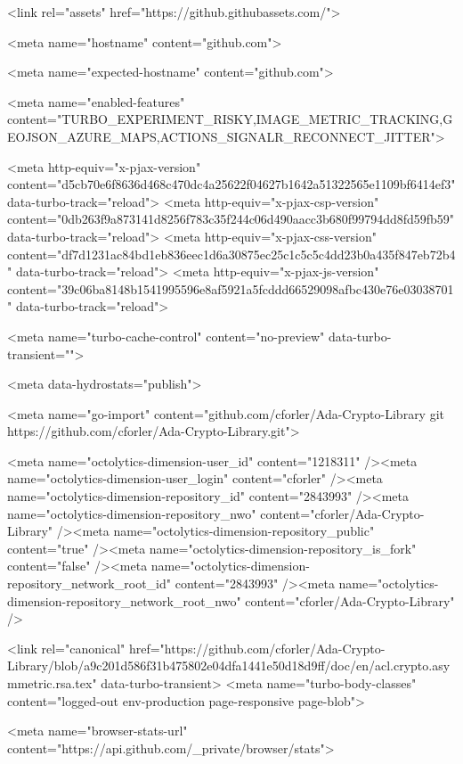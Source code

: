     <link rel="assets" href="https://github.githubassets.com/">


        <meta name="hostname" content="github.com">



        <meta name="expected-hostname" content="github.com">

    <meta name="enabled-features" content="TURBO_EXPERIMENT_RISKY,IMAGE_METRIC_TRACKING,GEOJSON_AZURE_MAPS,ACTIONS_SIGNALR_RECONNECT_JITTER">


  <meta http-equiv="x-pjax-version" content="d5cb70e6f8636d468c470dc4a25622f04627b1642a51322565e1109bf6414ef3" data-turbo-track="reload">
  <meta http-equiv="x-pjax-csp-version" content="0db263f9a873141d8256f783c35f244c06d490aacc3b680f99794dd8fd59fb59" data-turbo-track="reload">
  <meta http-equiv="x-pjax-css-version" content="df7d1231ac84bd1eb836eec1d6a30875ec25c1c5c5c4dd23b0a435f847eb72b4" data-turbo-track="reload">
  <meta http-equiv="x-pjax-js-version" content="39c06ba8148b1541995596e8af5921a5fcddd66529098afbc430e76e03038701" data-turbo-track="reload">

  <meta name="turbo-cache-control" content="no-preview" data-turbo-transient="">

        <meta data-hydrostats="publish">

  <meta name="go-import" content="github.com/cforler/Ada-Crypto-Library git https://github.com/cforler/Ada-Crypto-Library.git">

  <meta name="octolytics-dimension-user_id" content="1218311" /><meta name="octolytics-dimension-user_login" content="cforler" /><meta name="octolytics-dimension-repository_id" content="2843993" /><meta name="octolytics-dimension-repository_nwo" content="cforler/Ada-Crypto-Library" /><meta name="octolytics-dimension-repository_public" content="true" /><meta name="octolytics-dimension-repository_is_fork" content="false" /><meta name="octolytics-dimension-repository_network_root_id" content="2843993" /><meta name="octolytics-dimension-repository_network_root_nwo" content="cforler/Ada-Crypto-Library" />



    <link rel="canonical" href="https://github.com/cforler/Ada-Crypto-Library/blob/a9c201d586f31b475802e04dfa1441e50d18d9ff/doc/en/acl.crypto.asymmetric.rsa.tex" data-turbo-transient>
  <meta name="turbo-body-classes" content="logged-out env-production page-responsive page-blob">


  <meta name="browser-stats-url" content="https://api.github.com/_private/browser/stats">

